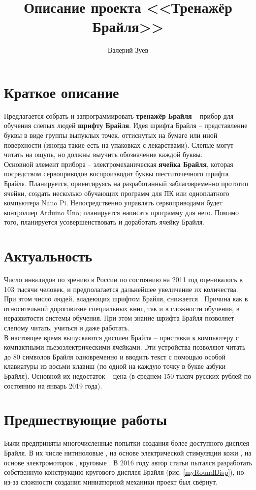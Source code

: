 \documentclass[a4paper,12pt]{article} %
\begin{document}
\title{Описание проекта <<Тренажёр Брайля>>}
\author{Валерий Зуев}
\maketitle
\section{Краткое описание}
Предлагается собрать и запрограммировать \textbf{тренажёр Брайля} -- прибор для обучения слепых людей \textbf{шрифту Брайля}. Идея шрифта Брайля -- представление буквы в виде группы выпуклых точек, оттиснутых на бумаге или иной поверхности (иногда такие есть на упаковках с лекарствами). Слепые могут читать на ощупь, но должны выучить обозначение каждой буквы.\\
Основной элемент прибора -- электромеханическая \textbf{ячейка Брайля}, которая посредством сервоприводов воспроизводит буквы шеститочечного шрифта Брайля. Планируется, ориентируясь на разработанный заблаговременно прототип ячейки, создать несколько обучающих программ для ПК или одноплатного компьютера Nano Pi. Непосредственно управлять сервоприводами будет контроллер Arduino Uno; планируется написать программу для него. Помимо того, планируется усовершенствовать и доработать ячейку Брайля.

\section{Актуальность}
Число инвалидов по зрению в России по состоянию на 2011 год оценивалось в 103 тысячи человек, и предполагается дальнейшее увеличение их количества\cite{stat}. При этом число людей, владеющих шрифтом Брайля, снижается \cite{brailleLower}. Причина как в относительной дороговизне специальных книг, так и в сложности обучения, в неразвитости системы обучения. При этом знание шрифта Брайля позволяет слепому читать, учиться и даже работать.\\
В настоящее время выпускаются дисплеи Брайля -- приставки к компьютеру с компактными пьезоэлектрическими ячейками. Эти устройства позволяют читать до 80 символов Брайля одновременно и вводить текст с помощью особой клавиатуры из восьми клавиш (по одной на каждую точку в букве азбуки Брайля). Основной их недостаток -- цена (в среднем 150 тысяч русских рублей по состоянию на январь 2019 года).

\section{Предшествующие работы}
Были предприняты многочисленные попытки создания более доступного дисплея Брайля.  В их числе нитиноловые \cite{sma}, на основе электрической стимуляции кожи \cite{kaji1} \cite{kaji2}, на основе электромоторов \cite{bristol}, круговые \cite{rotDisp}. В 2016 году автор статьи пытался разработать собственную конструкцию кругового дисплея Брайля (рис. \ref{myRoundDisp}), но из-за сложности создания миниатюрной механики проект был свёрнут.\\
\end{document}
